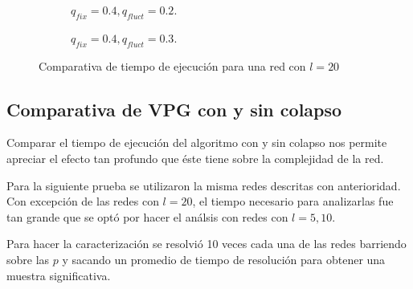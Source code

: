 \begin{figure}
  \begin{subfigure}{0.45\textwidth}
  \caption{$q_{fix}=0.4, q_{fluct}=0.2$.}
  \end{subfigure}
  \hfill
	\begin{subfigure}{0.45\textwidth}
  \caption{$q_{fix}=0.4, q_{fluct}=0.3$.}
  \end{subfigure}
  
  \caption{Comparativa de tiempo de ejecución para una red con $l=20$}
  \label{fig:comparativa-tiempo}
\end{figure}


\subsection{Comparativa de VPG con y sin colapso}

Comparar el tiempo de ejecución del algoritmo con y sin colapso nos permite apreciar el efecto tan profundo que éste tiene sobre la complejidad de la red.

Para la siguiente prueba se utilizaron la misma redes descritas con anterioridad. Con excepción de las redes con $l=20$, el tiempo necesario para analizarlas fue tan grande que se optó por hacer el análsis con redes con $l=5, 10$.

Para hacer la caracterización se resolvió 10 veces cada una de las redes barriendo sobre las $p$ y sacando un promedio de tiempo de resolución para obtener una muestra significativa.

